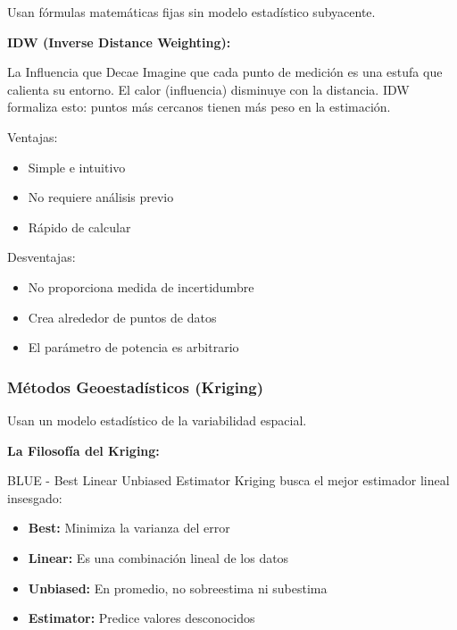 \documentclass[12pt,a4paper]{article}
\begin{document}
Usan fórmulas matemáticas fijas sin modelo estadístico subyacente.

\textbf{IDW (Inverse Distance Weighting):}

\begin{analogia}{La Influencia que Decae}
Imagine que cada punto de medición es una estufa que calienta su entorno. El calor (influencia) disminuye con la distancia. IDW formaliza esto: puntos más cercanos tienen más peso en la estimación.
\end{analogia}

Ventajas:
\begin{itemize}
    \item Simple e intuitivo
    \item No requiere análisis previo
    \item Rápido de calcular
\end{itemize}

Desventajas:
\begin{itemize}
    \item No proporciona medida de incertidumbre
    \item Crea  alrededor de puntos de datos
    \item El parámetro de potencia es arbitrario
\end{itemize}

\subsubsection{Métodos Geoestadísticos (Kriging)}

Usan un modelo estadístico de la variabilidad espacial.

\textbf{La Filosofía del Kriging:}

\begin{conceptbox}{BLUE - Best Linear Unbiased Estimator}
Kriging busca el mejor estimador lineal insesgado:
\begin{itemize}
    \item \textbf{Best:} Minimiza la varianza del error
    \item \textbf{Linear:} Es una combinación lineal de los datos
    \item \textbf{Unbiased:} En promedio, no sobreestima ni subestima
    \item \textbf{Estimator:} Predice valores desconocidos
\end{itemize}
\end{conceptbox}

\end{document}
